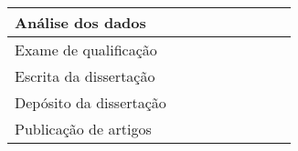 \begin{table}[h]
\begin{tabular}{|l|c|c|c|c|c|c|c|c|}
  Análise dos dados
  & \x & \x & \x & \x & \x  & \x & \y & \y \\
  \hline  
  \hline
  
  Exame de qualificação
  & \x & \x & \x & \x & \x  & \y & \x & \x \\
  \hline  
  
  Escrita da dissertação
  & \x & \x & \x & \x & \x  & \x & \y & \y \\
  \hline  
  
  Depósito da dissertação
  & \x & \x & \x & \x & \x  & \x & \x & \y \\
  \hline  
  
  Publicação de artigos
  & \x & \x & \y & \x & \x  & \x & \x & \y \\
  \hline  
  
 
\end{tabular}
 \normalsize
\end{table}






